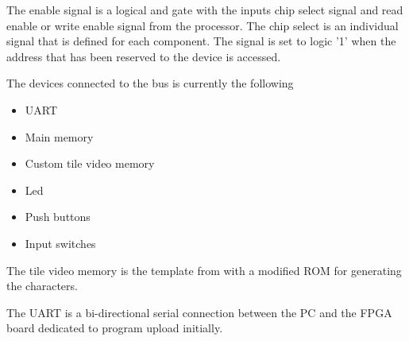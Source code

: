 \documentclass{acm_proc_article-sp}
\begin{document}
The enable signal is a logical and gate with the inputs chip select signal and read enable or write enable signal from the processor. The chip select is an individual signal that is defined for each component. The signal is set to logic '1' when the address that has been reserved to the device is accessed.

The devices connected to the bus is currently the following
\begin{itemize}
	\item UART
	\item Main memory
	\item Custom tile video memory
	\item Led
	\item Push buttons
	\item Input switches
\end{itemize}
The tile video memory is the template from \cite{chu2008fpga} with a modified ROM for generating the characters.

The UART is a bi-directional serial connection between the PC and the FPGA board dedicated to program upload initially.
\end{document}
